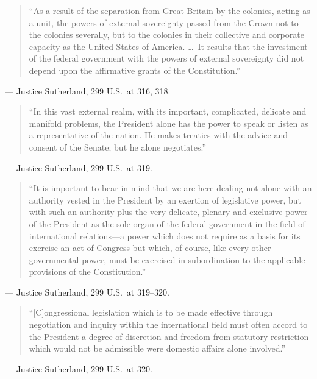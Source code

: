 \documentclass[12pt]{article}
\begin{document}
\begin{quote}
``As a result of the separation from Great Britain by the colonies, acting as a unit, the powers of external sovereignty passed from the Crown not to the colonies severally, but to the colonies in their collective and corporate capacity as the United States of America. \dots\ It results that the investment of the federal government with the powers of external sovereignty did not depend upon the affirmative grants of the Constitution.''
\end{quote}
\noindent --- Justice Sutherland, 299 U.S.\ at 316, 318.

\begin{quote}
``In this vast external realm, with its important, complicated, delicate and manifold problems, the President alone has the power to speak or listen as a representative of the nation. He makes treaties with the advice and consent of the Senate; but he alone negotiates.''
\end{quote}
\noindent --- Justice Sutherland, 299 U.S.\ at 319.

\begin{quote}
``It is important to bear in mind that we are here dealing not alone with an authority vested in the President by an exertion of legislative power, but with such an authority plus the very delicate, plenary and exclusive power of the President as the sole organ of the federal government in the field of international relations---a power which does not require as a basis for its exercise an act of Congress but which, of course, like every other governmental power, must be exercised in subordination to the applicable provisions of the Constitution.''
\end{quote}
\noindent --- Justice Sutherland, 299 U.S.\ at 319--320.

\begin{quote}
``[C]ongressional legislation which is to be made effective through negotiation and inquiry within the international field must often accord to the President a degree of discretion and freedom from statutory restriction which would not be admissible were domestic affairs alone involved.''
\end{quote}
\noindent --- Justice Sutherland, 299 U.S.\ at 320.
\end{document}
